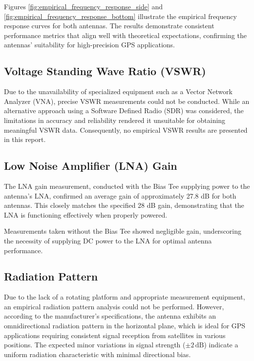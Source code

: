 \documentclass[12pt,letter]{article}
\begin{document}
Figures \ref{fig:empirical_frequency_response_side} and \ref{fig:empirical_frequency_response_bottom} illustrate the empirical frequency response curves for both antennas. The results demonstrate consistent performance metrics that align well with theoretical expectations, confirming the antennas' suitability for high-precision GPS applications.

\subsection*{Voltage Standing Wave Ratio (VSWR)}

Due to the unavailability of specialized equipment such as a Vector Network Analyzer (VNA), precise VSWR measurements could not be conducted. While an alternative approach using a Software Defined Radio (SDR) was considered, the limitations in accuracy and reliability rendered it unsuitable for obtaining meaningful VSWR data. Consequently, no empirical VSWR results are presented in this report.

\subsection*{Low Noise Amplifier (LNA) Gain}

The LNA gain measurement, conducted with the Bias Tee supplying power to the antenna's LNA, confirmed an average gain of approximately 27.8 dB for both antennas. This closely matches the specified 28 dB gain, demonstrating that the LNA is functioning effectively when properly powered. 

Measurements taken without the Bias Tee showed negligible gain, underscoring the necessity of supplying DC power to the LNA for optimal antenna performance.

\subsection*{Radiation Pattern}

Due to the lack of a rotating platform and appropriate measurement equipment, an empirical radiation pattern analysis could not be performed. However, according to the manufacturer's specifications, the antenna exhibits an omnidirectional radiation pattern in the horizontal plane, which is ideal for GPS applications requiring consistent signal reception from satellites in various positions. The expected minor variations in signal strength (\(\pm 2\, \text{dB}\)) indicate a uniform radiation characteristic with minimal directional bias.
\end{document}
